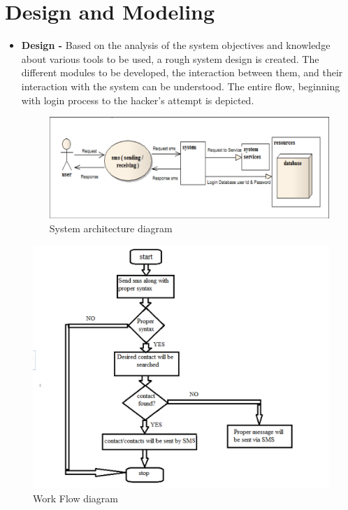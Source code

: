 \section{Design and Modeling}
\hspace{0.9cm} 
	\begin{itemize}
		\item \textbf{Design - } Based on the analysis of the system objectives and knowledge about various tools to be used, a rough system design is created. The different modules to be developed, the interaction between them, and their interaction with the system can be understood. The entire flow, beginning with login process to the hacker’s attempt is depicted.
		\begin{figure}[h!]
			\centering	
			\includegraphics[width=5.5in]{sysarc.png} %
			\caption{System architecture diagram}
			\label{fig:2} %
			
		\end{figure} 
		\end{itemize}
		
		
		\begin{figure}[h!]
			\includegraphics[width=5.5in]{workflow.png} %
			\caption{Work Flow diagram}
			\label{fig:3} %
			
		\end{figure} 
	
